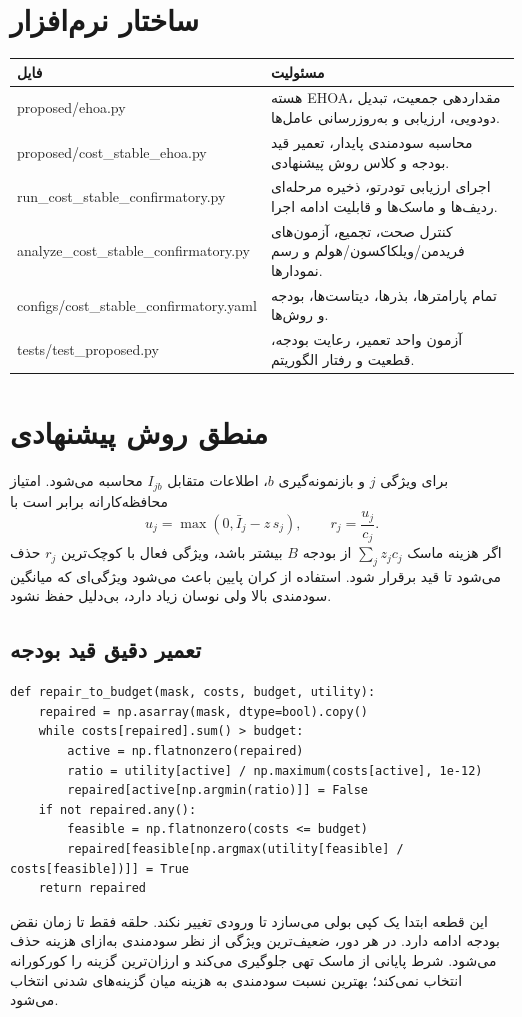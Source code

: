\documentclass[12pt,a4paper]{article}
\newcommand{\lr}[1]{\foreignlanguage{english}{#1}}
\newenvironment{latin}{\begin{otherlanguage}{english}}{\end{otherlanguage}}
\begin{document}
\section{ساختار نرم‌افزار}
\begin{longtable}{>{\raggedleft\arraybackslash}p{}p{}}
\toprule فایل & مسئولیت\\\midrule
\lr{proposed/ehoa.py} & هسته EHOA، مقداردهی جمعیت، تبدیل دودویی، ارزیابی و به‌روزرسانی عامل‌ها.\\
\lr{proposed/cost\_stable\_ehoa.py} & محاسبه سودمندی پایدار، تعمیر قید بودجه و کلاس روش پیشنهادی.\\
\lr{run\_cost\_stable\_confirmatory.py} & اجرای ارزیابی تو‌در‌تو، ذخیره مرحله‌ای ردیف‌ها و ماسک‌ها و قابلیت ادامه اجرا.\\
\lr{analyze\_cost\_stable\_confirmatory.py} & کنترل صحت، تجمیع، آزمون‌های فریدمن/ویلکاکسون/هولم و رسم نمودارها.\\
\lr{configs/cost\_stable\_confirmatory.yaml} & تمام پارامترها، بذرها، دیتاست‌ها، بودجه و روش‌ها.\\
\lr{tests/test\_proposed.py} & آزمون واحد تعمیر، رعایت بودجه، قطعیت و رفتار الگوریتم.\\\bottomrule
\end{longtable}

\section{منطق روش پیشنهادی}
برای ویژگی $j$ و بازنمونه‌گیری $b$، اطلاعات متقابل $I_{jb}$ محاسبه می‌شود. امتیاز محافظه‌کارانه برابر است با
\begin{equation}u_j=\max\left(0,\bar I_j-z\,s_j\right),\qquad r_j=\frac{u_j}{c_j}.\end{equation}
اگر هزینه ماسک $\sum_j z_jc_j$ از بودجه $B$ بیشتر باشد، ویژگی فعال با کوچک‌ترین $r_j$ حذف می‌شود تا قید برقرار شود. استفاده از کران پایین باعث می‌شود ویژگی‌ای که میانگین سودمندی بالا ولی نوسان زیاد دارد، بی‌دلیل حفظ نشود.

\subsection{تعمیر دقیق قید بودجه}
\begin{latin}\begin{lstlisting}
def repair_to_budget(mask, costs, budget, utility):
    repaired = np.asarray(mask, dtype=bool).copy()
    while costs[repaired].sum() > budget:
        active = np.flatnonzero(repaired)
        ratio = utility[active] / np.maximum(costs[active], 1e-12)
        repaired[active[np.argmin(ratio)]] = False
    if not repaired.any():
        feasible = np.flatnonzero(costs <= budget)
        repaired[feasible[np.argmax(utility[feasible] / costs[feasible])]] = True
    return repaired
\end{lstlisting}\end{latin}
این قطعه ابتدا یک کپی بولی می‌سازد تا ورودی تغییر نکند. حلقه فقط تا زمان نقض بودجه ادامه دارد. در هر دور، ضعیف‌ترین ویژگی از نظر سودمندی به‌ازای هزینه حذف می‌شود. شرط پایانی از ماسک تهی جلوگیری می‌کند و ارزان‌ترین گزینه را کورکورانه انتخاب نمی‌کند؛ بهترین نسبت سودمندی به هزینه میان گزینه‌های شدنی انتخاب می‌شود.
\end{document}

